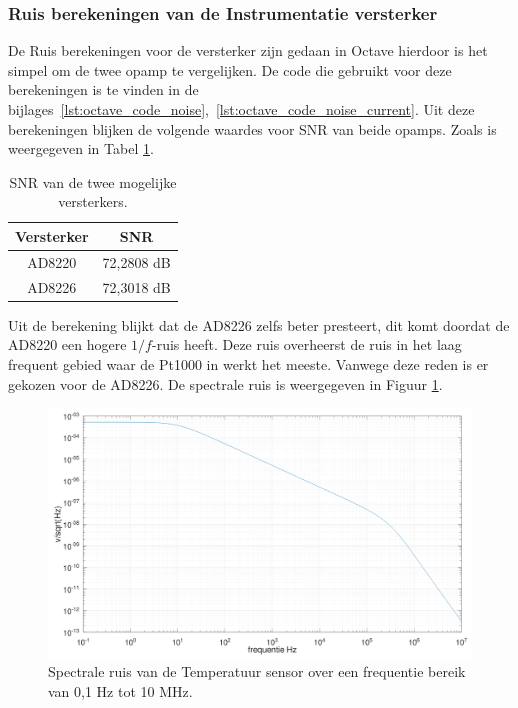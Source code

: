 \subsubsection{Ruis berekeningen van de Instrumentatie versterker}
De Ruis berekeningen voor de versterker zijn gedaan in Octave hierdoor is het simpel om de twee opamp te vergelijken. De code die gebruikt voor deze berekeningen is te vinden in de bijlages~\ref{lst:octave_code_noise},~\ref{lst:octave_code_noise_current}. Uit deze berekeningen blijken de volgende waardes voor SNR van beide opamps. Zoals is weergegeven in Tabel \ref{tab:SNR_opamps}.

\begin{table}[H]
    \centering
    \begin{tabular}{|c|c|}
        \hline
         \textbf{Versterker} & \textbf{SNR} \\ \hline
         AD8220 & 72,2808 dB \\ \hline
         AD8226 & 72,3018 dB \\ \hline
    \end{tabular}
    \caption{SNR van de twee mogelijke versterkers.}
    \label{tab:SNR_opamps}
\end{table}
Uit de berekening blijkt dat de AD8226 zelfs beter presteert, dit komt doordat de AD8220 een hogere \(1/f\)-ruis heeft. Deze ruis overheerst de ruis in het laag frequent gebied waar de Pt1000 in werkt het meeste. Vanwege deze reden is er gekozen voor de AD8226. De spectrale ruis is weergegeven in Figuur \ref{fig:spectral_ruis_plot}.

\begin{figure}[H]
    \centering
    \includegraphics[width=0.9\linewidth]{pictures/ruis_plot.png}
    \caption{Spectrale ruis van de Temperatuur sensor over een frequentie bereik van 0,1 Hz tot 10 MHz.}
    \label{fig:spectral_ruis_plot}
\end{figure}

